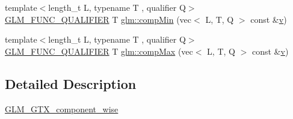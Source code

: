\begin{DoxyCompactItemize}
\item 
{\footnotesize template$<$length\+\_\+t L, typename T , qualifier Q$>$ }\\\mbox{\hyperlink{setup_8hpp_a33fdea6f91c5f834105f7415e2a64407}{G\+L\+M\+\_\+\+F\+U\+N\+C\+\_\+\+Q\+U\+A\+L\+I\+F\+I\+ER}} T \mbox{\hyperlink{namespaceglm_a10ecfac6e963c12a5e470233798de5aa}{glm\+::comp\+Min}} (vec$<$ L, T, Q $>$ const \&\mbox{\hyperlink{_s_d_l__opengl_8h_a10a82eabcb59d2fcd74acee063775f90}{v}})
\item 
{\footnotesize template$<$length\+\_\+t L, typename T , qualifier Q$>$ }\\\mbox{\hyperlink{setup_8hpp_a33fdea6f91c5f834105f7415e2a64407}{G\+L\+M\+\_\+\+F\+U\+N\+C\+\_\+\+Q\+U\+A\+L\+I\+F\+I\+ER}} T \mbox{\hyperlink{namespaceglm_a0d4cda53cef1caae2fb974492b2e81df}{glm\+::comp\+Max}} (vec$<$ L, T, Q $>$ const \&\mbox{\hyperlink{_s_d_l__opengl_8h_a10a82eabcb59d2fcd74acee063775f90}{v}})
\end{DoxyCompactItemize}


\subsection{Detailed Description}
\mbox{\hyperlink{group__gtx__component__wise}{G\+L\+M\+\_\+\+G\+T\+X\+\_\+component\+\_\+wise}} 